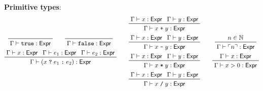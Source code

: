 \documentclass[11pt]{article}
\begin{document}
\textbf{Primitive types}: \begin{gather*}
\begin{gathered}
	\prftree{}{\Gamma \vdash \texttt{true} : \textsf{Expr}} \qquad
	\prftree{}{\Gamma \vdash \texttt{false}: \textsf{Expr}} \\
	\prftree{\Gamma \vdash x : \textsf{Expr}}{\Gamma \vdash e_1 : \textsf{Expr}}{\Gamma \vdash e_2 : \textsf{Expr}}{\Gamma \vdash (x\;\texttt{?}\;e_1\;\texttt{:}\;e_2) : \textsf{Expr}}
\end{gathered}
	\qquad
\begin{gathered}
	\prftree{\Gamma \vdash x : \textsf{Expr}}{\Gamma \vdash y : \textsf{Expr}}{\Gamma \vdash x\;\texttt{+}\;y : \textsf{Expr}} \\
	\prftree{\Gamma \vdash x : \textsf{Expr}}{\Gamma \vdash y : \textsf{Expr}}{\Gamma \vdash x\;\texttt{-}\;y : \textsf{Expr}} \\
	\prftree{\Gamma \vdash x : \textsf{Expr}}{\Gamma \vdash y : \textsf{Expr}}{\Gamma \vdash x\;\texttt{*}\;y : \textsf{Expr}} \\
	\prftree{\Gamma \vdash x : \textsf{Expr}}{\Gamma \vdash y : \textsf{Expr}}{\Gamma \vdash x\;\texttt{/}\;y : \textsf{Expr}}
\end{gathered}
	\qquad
\begin{gathered}
	\prftree{n \in \mathbb{N}}{\Gamma \vdash \ulcorner n \urcorner : \textsf{Expr}} \\
	\prftree{\Gamma \vdash x : \textsf{Expr}}{\Gamma \vdash x > 0 : \textsf{Expr}}
\end{gathered}
\end{gather*}

\printbibliography
\end{document}

